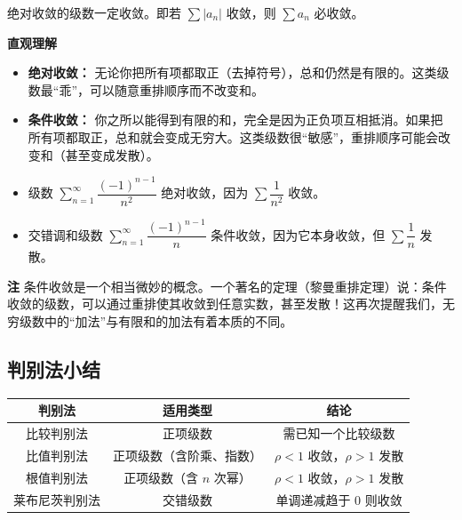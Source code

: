 \documentclass{ctexart}
\newenvironment{custom}[1]{\par\noindent \textbf{#1}\quad}{\par\vspace{1em}}
\begin{document}
\begin{example}[加减结构中的错误示例]
\begin{theorem}[绝对收敛与收敛的关系]
绝对收敛的级数一定收敛。即若 \(\sum |a_n|\) 收敛，则 \(\sum a_n\) 必收敛。
\end{theorem}

\begin{custom}{直观理解}
\begin{itemize}
\item \textbf{绝对收敛：} 无论你把所有项都取正（去掉符号），总和仍然是有限的。这类级数最“乖”，可以随意重排顺序而不改变和。
\item \textbf{条件收敛：} 你之所以能得到有限的和，完全是因为正负项互相抵消。如果把所有项都取正，总和就会变成无穷大。这类级数很“敏感”，重排顺序可能会改变和（甚至变成发散）。
\end{itemize}
\end{custom}

\begin{example}
\begin{itemize}
\item 级数 \(\sum_{n=1}^{\infty} \dfrac{(-1)^{n-1}}{n^2}\) 绝对收敛，因为 \(\sum \dfrac{1}{n^2}\) 收敛。
\item 交错调和级数 \(\sum_{n=1}^{\infty} \dfrac{(-1)^{n-1}}{n}\) 条件收敛，因为它本身收敛，但 \(\sum \dfrac{1}{n}\) 发散。
\end{itemize}
\end{example}

\begin{custom}{注}
条件收敛是一个相当微妙的概念。一个著名的定理（黎曼重排定理）说：条件收敛的级数，可以通过重排使其收敛到任意实数，甚至发散！这再次提醒我们，无穷级数中的“加法”与有限和的加法有着本质的不同。
\end{custom}

\subsection{判别法小结}

\begin{tabular}{|c|c|c|}
\hline
\textbf{判别法} & \textbf{适用类型} & \textbf{结论} \\
\hline
比较判别法 & 正项级数 & 需已知一个比较级数 \\
\hline
比值判别法 & 正项级数（含阶乘、指数） & \(\rho < 1\) 收敛，\(\rho > 1\) 发散 \\
\hline
根值判别法 & 正项级数（含 \(n\) 次幂） & \(\rho < 1\) 收敛，\(\rho > 1\) 发散 \\
\hline
莱布尼茨判别法 & 交错级数 & 单调递减趋于 0 则收敛 \\
\hline
\end{tabular}


\end{example}
\end{document}
